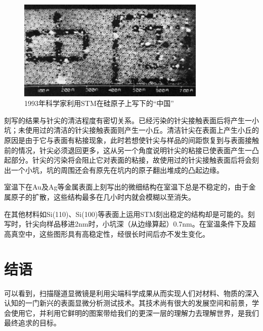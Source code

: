 \documentclass[12pt,a4paper]{ctexart}
\begin{document}
\begin{figure}
	\centering
	\includegraphics[width=0.8\textwidth]{figures/stm}
	\caption[ZhongGuo]{1993年科学家利用STM在硅原子上写下的“中国”}
	\label{fig:ZhongGuo}
\end{figure}

刻写的结果与针尖的清洁程度有密切关系。已经污染的针尖接触表面后将产生一小坑；未使用过的清洁的针尖接触表面则产生一小丘。清洁针尖在表面上产生小丘的原因是由于它与表面有粘接现象，此时若想使针尖与样品的间距恢复到与表面接触前的情况，针尖必须退回更多，这从另一个角度说明针尖的粘接已使表面产生一凸起部分。针尖的污染将会阻止它对表面的粘接，故使用过的针尖接触表面后将会刻出一个小坑，坑的周围还会有原先在坑内的原子翻出堆成的凸起边缘。

室温下在Au及Ag等金属表面上刻写出的微细结构在室温下总是不稳定的，由于金属原子的扩散，这些结构最多在几小时内就会模糊以至消失。

在其他材料如Si(110)、Si(100)等表面上运用STM刻出稳定的结构却是可能的。刻写时，针尖向样品移进2nm时，小坑深（从边缘算起）0.7nm。在室温条件下及超高真空中，这些图形具有高稳定性，经很长时间后亦不发生变化。

\section{结语}
可以看到，扫描隧道显微镜是利用尖端科学成果从而实现人们对材料、物质的深入认知的一门新兴的表面显微分析测试技术。其技术尚有很大的发展空间和前景，学会使用它，并利用它鲜明的图案带给我们的更深一层的理解力去理解世界，是我们最终追求的目标。
\end{document}

